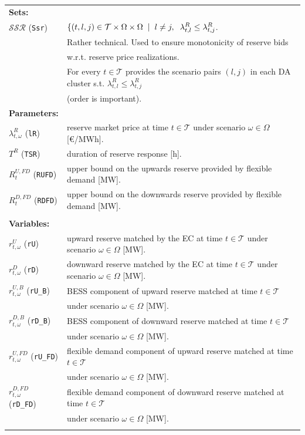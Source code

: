 \documentclass{article}
\begin{document}
\begin{tabularx}{\textwidth}{l l}
    \textbf{Sets:} \\
		$\mathcal{SSR}$ (\verb|Ssr|) & $\{(t, l, j) \in \mathcal{T} \times \Omega \times \Omega \hspace{2mm} | \hspace{2mm} l \neq j, \hspace{2mm} \lambda^R_{t, l} \leq \lambda^R_{t, j}$.  \\
	& Rather technical. Used to ensure monotonicity of reserve bids \\
	& w.r.t. reserve price realizations. \\  
	& For every $t \in \mathcal{T}$ provides the scenario pairs $(l, j)$ in each DA cluster s.t. $\lambda^R_{t, l} \leq \lambda^R_{t, j}$ \\
	& (order is important).    
    \\
    \textbf{Parameters:} \\
    	$\lambda^{R}_{t, \omega}$ (\verb|lR|) & reserve market price at time $t \in \mathcal{T}$ under scenario $\omega \in \Omega$ [\euro/MWh]. \\
    	$T^R$ (\verb|TSR|) & duration of reserve response [h]. \\
    	$R^{U, FD}_t$ (\verb|RUFD|) & upper bound on the upwards reserve provided by flexible demand [MW]. \\
    	$R^{D, FD}_t$ (\verb|RDFD|) & upper bound on the downwards reserve provided by flexible demand [MW]. \\
    \\
       
    \textbf{Variables:} \\
	$r^{U}_{t, \omega}$ (\verb|rU|) & upward reserve matched by the EC at time $t \in \mathcal{T}$ under scenario $\omega \in \Omega$ [MW]. \\
    $r^{D}_{t, \omega}$ (\verb|rD|) & downward reserve matched by the EC at time $t \in \mathcal{T}$ under scenario $\omega \in \Omega$ [MW]. \\
    $r^{U, B}_{t, \omega}$ (\verb|rU_B|) & BESS component of upward reserve matched at time $t \in \mathcal{T}$ \\
    & under scenario $\omega \in \Omega$ [MW]. \\
    $r^{D, B}_{t, \omega}$ (\verb|rD_B|) & BESS component of downward reserve matched at time $t \in \mathcal{T}$ \\
    & under scenario $\omega \in \Omega$ [MW]. \\
    $r^{U, FD}_{t, \omega}$ (\verb|rU_FD|) & flexible demand component of upward reserve matched at time $t \in \mathcal{T}$ \\
    & under scenario $\omega \in \Omega$ [MW]. \\
    $r^{D, FD}_{t, \omega}$ (\verb|rD_FD|) & flexible demand component of downward reserve matched at time $t \in \mathcal{T}$ \\
    & under scenario $\omega \in \Omega$ [MW]. \\
    \\
\end{tabularx}
\end{document}
